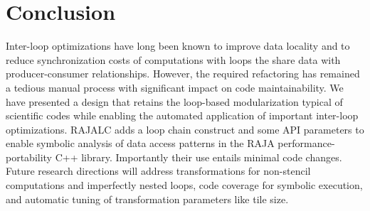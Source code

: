 \section{Conclusion}

Inter-loop optimizations have long been known to improve data locality and 
to reduce synchronization costs of computations with loops the share data
with producer-consumer relationships.
However, the required refactoring has remained a tedious manual process with 
significant impact on code maintainability.
We have presented a design that retains the loop-based modularization typical
of scientific codes while enabling the automated application of important
inter-loop optimizations.
RAJALC adds a loop chain construct and some API parameters to enable symbolic
analysis of data access patterns in the RAJA performance-portability C++
library. 
Importantly their use entails minimal code changes. 
Future research directions will address transformations for non-stencil
computations and imperfectly nested loops, code coverage for symbolic
execution, and automatic tuning of transformation parameters like tile size.
\begin{comment}
 we were able to incorporate fusion and overlapped tiling, inter-loop
transformations in the LULESH proxy application by modifying/adding only todo{??}
lines of code while observing a \todo{??} performance improvement due to inter-loop data locality
improvements over the \todo{hand-optimized OpenMP version of LULESH(?)}.
\end{comment}

